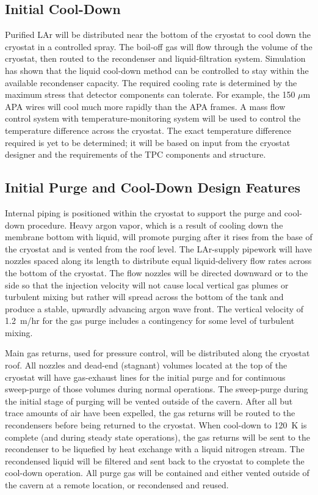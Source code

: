 \subsection{Initial Cool-Down}

Purified LAr will be distributed near
the bottom of the cryostat to cool down the cryostat in a controlled spray.
The boil-off gas will flow through the volume of the cryostat, then
routed to the recondenser and liquid-filtration system. Simulation
has shown that the liquid cool-down method can
be controlled to stay within the available recondenser capacity. The required cooling rate
is determined by the maximum stress that detector components can
tolerate. For example, the 150 $\mu$m APA wires will cool much more rapidly than the APA frames.
A mass flow control system with temperature-monitoring system will be used to control the
temperature difference across the cryostat. The exact temperature difference required is yet to
be determined; it will be based on input from the cryostat designer and the requirements of
the TPC components and structure.

\subsection{Initial Purge and Cool-Down Design Features}

Internal piping is positioned within the cryostat to support the purge and cool-down procedure.  Heavy argon vapor, which is a result of cooling down the membrane bottom with liquid, will promote purging after it rises from the base of the cryostat and is vented from the roof level.  The LAr-supply pipework will have nozzles spaced along its length to 
 distribute equal liquid-delivery flow rates across the bottom of the cryostat.  The flow nozzles will be directed downward or to the side so that the injection velocity will not cause local vertical gas plumes or turbulent mixing but rather will spread across the bottom of the tank and produce a stable, upwardly advancing argon wave front. The vertical velocity of 1.2~m/hr for the gas purge includes a contingency for some level of turbulent mixing. 

Main gas returns, used for pressure control, will be distributed along the cryostat roof.  All nozzles and dead-end (stagnant) volumes located at the top of the cryostat will have gas-exhaust lines for the initial purge and for continuous sweep-purge of those volumes during normal operations.  
The sweep-purge during the initial stage of purging will be vented outside of the cavern.  After all but trace amounts of air have been expelled, the gas returns will be routed to the recondensers before being returned to the cryostat.  When cool-down to 120~K is complete (and during steady state operations), the gas returns will be sent to the recondenser to be liquefied by heat exchange with a liquid nitrogen stream.  The recondensed liquid will be filtered and sent back to the cryostat to complete the cool-down operation.
All purge gas will be contained and either vented outside of the cavern at a remote location, or recondensed and reused. 

